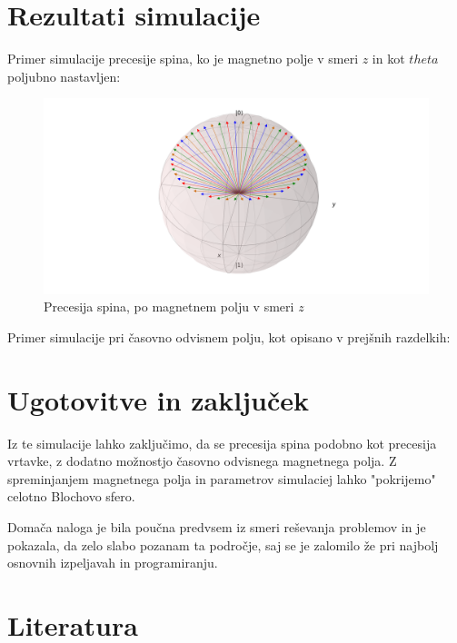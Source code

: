 \documentclass[12pt, a4paper]{article}
\begin{document}
\section{Rezultati simulacije}
Primer simulacije precesije spina, ko je magnetno polje v smeri $z$ in kot $theta$ poljubno nastavljen:
\begin{figure}[H]
  \includegraphics[width=500pt]{slike/precesija_po_osi_z}
  \caption{Precesija spina, po magnetnem polju v smeri $z$}
  \label{fig:boat1}
\end{figure}
Primer simulacije pri časovno odvisnem polju, kot opisano v prejšnih razdelkih:
\section{Ugotovitve in zaključek}
Iz te simulacije lahko zaključimo, da se precesija spina podobno kot precesija vrtavke, z dodatno možnostjo časovno odvisnega magnetnega polja. Z spreminjanjem magnetnega polja in parametrov simulaciej lahko "pokrijemo" celotno Blochovo sfero.

Domača naloga je bila poučna predvsem iz smeri reševanja problemov in je pokazala, da zelo slabo pozanam ta področje, saj se je zalomilo že pri najbolj osnovnih izpeljavah in programiranju.

\section{Literatura}
\end{document}
